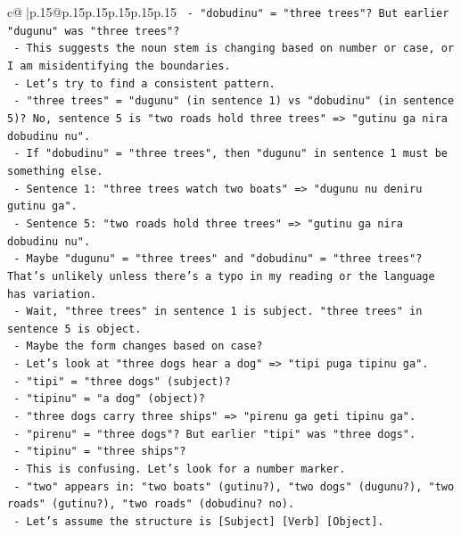 \documentclass{article}
\begin{document}
{\begin{supertabular}{c@{$\;$}|p{.15\linewidth}@{}p{.15\linewidth}p{.15\linewidth}p{.15\linewidth}p{.15\linewidth}p{.15\linewidth}}
{{{\texttt{            {-} "dobudinu" = "three trees"? But earlier "dugunu" was "three trees"?} \\
\texttt{          {-} This suggests the noun stem is changing based on number or case, or I am misidentifying the boundaries.} \\
\texttt{          {-} Let's try to find a consistent pattern.} \\
\texttt{          {-} "three trees" = "dugunu" (in sentence 1) vs "dobudinu" (in sentence 5)? No, sentence 5 is "two roads hold three trees" => "gutinu ga nira dobudinu nu".} \\
\texttt{            {-} If "dobudinu" = "three trees", then "dugunu" in sentence 1 must be something else.} \\
\texttt{            {-} Sentence 1: "three trees watch two boats" => "dugunu nu deniru gutinu ga".} \\
\texttt{            {-} Sentence 5: "two roads hold three trees" => "gutinu ga nira dobudinu nu".} \\
\texttt{            {-} Maybe "dugunu" = "three trees" and "dobudinu" = "three trees"? That's unlikely unless there's a typo in my reading or the language has variation.} \\
\texttt{            {-} Wait, "three trees" in sentence 1 is subject. "three trees" in sentence 5 is object.} \\
\texttt{            {-} Maybe the form changes based on case?} \\
\texttt{            {-} Let's look at "three dogs hear a dog" => "tipi puga tipinu ga".} \\
\texttt{              {-} "tipi" = "three dogs" (subject)?} \\
\texttt{              {-} "tipinu" = "a dog" (object)?} \\
\texttt{            {-} "three dogs carry three ships" => "pirenu ga geti tipinu ga".} \\
\texttt{              {-} "pirenu" = "three dogs"? But earlier "tipi" was "three dogs".} \\
\texttt{              {-} "tipinu" = "three ships"?} \\
\texttt{            {-} This is confusing. Let's look for a number marker.} \\
\texttt{            {-} "two" appears in: "two boats" (gutinu?), "two dogs" (dugunu?), "two roads" (gutinu?), "two roads" (dobudinu? no).} \\
\texttt{            {-} Let's assume the structure is {[}Subject{]} {[}Verb{]} {[}Object{]}.} \\
}}}
\end{supertabular}}
\end{document}
